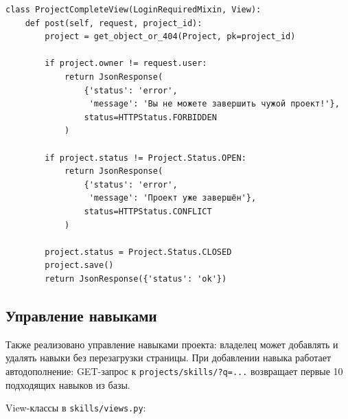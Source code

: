 \documentclass[bachelor, och, pract]{../SCWorks}
\begin{document}
\begin{lstlisting}
class ProjectCompleteView(LoginRequiredMixin, View):
    def post(self, request, project_id):
        project = get_object_or_404(Project, pk=project_id)

        if project.owner != request.user:
            return JsonResponse(
                {'status': 'error',
                 'message': 'Вы не можете завершить чужой проект!'},
                status=HTTPStatus.FORBIDDEN
            )

        if project.status != Project.Status.OPEN:
            return JsonResponse(
                {'status': 'error',
                 'message': 'Проект уже завершён'},
                status=HTTPStatus.CONFLICT
            )

        project.status = Project.Status.CLOSED
        project.save()
        return JsonResponse({'status': 'ok'})
\end{lstlisting}

\newpage
\subsection{Управление навыками}

Также реализовано управление навыками проекта: владелец может добавлять и удалять навыки без перезагрузки страницы.
При добавлении навыка работает автодополнение: GET-запрос к \texttt{projects/skills/?q=...} возвращает первые 10 подходящих навыков из базы.

View-классы в \texttt{skills/views.py}:
\end{document}
